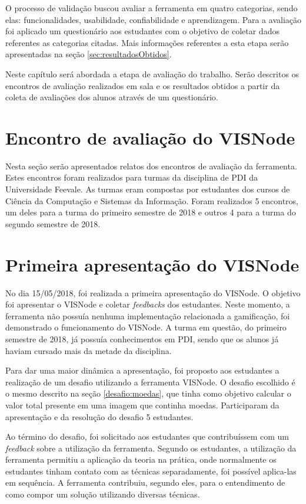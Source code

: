 \documentclass[
	12pt,				%
	oneside,			%
	a4paper,			%
	english,			%
	french,				%
	spanish,			%
	brazil,				%
	]{abntex2}
\begin{document}
O processo de validação buscou avaliar a ferramenta em quatro categorias, sendo elas: funcionalidades, usabilidade, confiabilidade e aprendizagem. Para a avaliação foi aplicado um questionário aos estudantes com o objetivo de coletar dados referentes as categorias citadas. Mais informações referentes a esta etapa serão apresentadas na seção \ref{sec:resultadosObtidos}.

Neste capítulo será abordada a etapa de avaliação do trabalho. Serão descritos os encontros de avaliação realizados em sala e os resultados obtidos a partir da coleta de avaliações dos alunos através de um questionário.

\section{Encontro de avaliação do VISNode}

Nesta seção serão apresentados relatos dos encontros de avaliação da ferramenta. Estes encontros foram realizados para turmas da disciplina de PDI da Universidade Feevale. As turmas eram compostas por estudantes dos cursos de Ciência da Computação e Sistemas da Informação. Foram realizados 5 encontros, um deles para a turma do primeiro semestre de 2018 e outros 4 para a turma do segundo semestre de 2018.

\section{Primeira apresentação do VISNode}
\label{validacao:piloto1}

No dia 15/05/2018, foi realizada a primeira apresentação do VISNode. O objetivo foi apresentar o VISNode e coletar \textit{feedbacks} dos estudantes. Neste momento, a ferramenta não possuía nenhuma implementação relacionada a gamificação, foi demonstrado o funcionamento do VISNode. A turma em questão, do primeiro semestre de 2018, já possuía conhecimentos em PDI, sendo que os alunos já haviam cursado mais da metade da disciplina.

Para dar uma maior dinâmica a apresentação, foi proposto aos estudantes a realização de um desafio utilizando a ferramenta VISNode. O desafio escolhido é o mesmo descrito na seção \ref{desafio:moedas}, que tinha como objetivo calcular o valor total presente em uma imagem que continha moedas. Participaram da apresentação e da resolução do desafio 5 estudantes.

Ao término do desafio, foi solicitado aos estudantes que contribuíssem com um \textit{feedback} sobre a utilização da ferramenta. Segundo os estudantes, a utilização da ferramenta permitiu a aplicação da teoria na prática, onde normalmente os estudantes tinham contato com as técnicas separadamente, foi possível aplica-las em sequência. A ferramenta contribuiu, segundo eles, para o entendimento de como compor um solução utilizando diversas técnicas.
\end{document}
